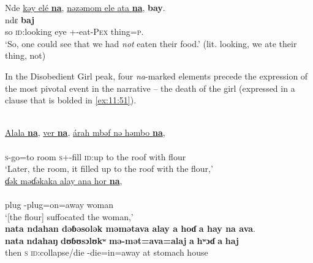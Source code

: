 \ea \label{ex:11:50}
Nde  \underline{kəy  elé  \textbf{na}},  \underline{nəzəmom  ele  ata  \textbf{na}},  \textbf{bay}.\\
\gll  ndɛ                        \textbf{baj}\\
      so  \textsc{id}:looking  eye  {\PSP}  {\oneS}+{\PFV}-eat-\textsc{Pex}    thing=\textsc{p}.{\POSS}  {\PSP}  {\NEG}\\
\glt  ‘So, one could see that we had \textit{not} eaten their food.’ (lit. looking, we ate their thing, not)
\z

In the Disobedient Girl peak, four \textit{na}{}-marked elements precede the expression of the most pivotal event in the narrative -- the death of the girl (expressed in a clause that is bolded in \ref{ex:11:51}). 

\ea \label{ex:11:51}
\\
\underline{Alala  \textbf{na}},  \underline{ver  \textbf{na}},  \underline{árah  mbəf  nə  həmbo  \textbf{na}},\\ 
\gll  {}                    \\      
      \textsc{s}-go=to  {\PSP} room  {\PSP} \textsc{s}+{\IFV}-fill  {\textsc{id}:up to the roof}  with  flour  {\PSP} \\      
\glt ‘Later, the room, it filled up to the roof with the flour,’\\

\medskip
\underline{ɗək  məɗəkaka  alay  ana  hor  \textbf{na}},\\
\gll {}        \\
     plug  {\NOM}{}-plug=on=away  {\DAT} woman  {\PSP}   \\ 
\glt ‘[the flour] suffocated the woman,’ \\

\medskip
\textbf{nata  ndahan  dəɓəsolək  məmətava  alay  a  hoɗ} \textbf{a  hay  na  ava}.\\
\gll \textbf{{nata}}  \textbf{ndahaŋ}   \textbf{dʊɓʊsɔlʊkʷ}   \textbf{mə-mət=ava=alaj}   \textbf{a}   \textbf{hʷɔɗ} \textbf{a}   \textbf{haj}   \\
     then    \textsc{s}  \textsc{id}:collapse/die  {\NOM}{}-die=in=away  at  stomach {\GEN}  house  \\
      
